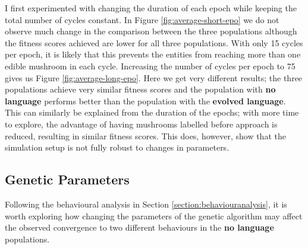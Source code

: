 \documentclass[12pt,a4paper]{report}
\begin{document}
I first experimented with changing the duration of each epoch while keeping the total number of cycles constant. In Figure \ref{fig:average-short-epo} we do not observe much change in the comparison between the three populations although the fitness scores achieved are lower for all three populations. With only 15 cycles per epoch, it is likely that this prevents the entities from reaching more than one edible mushroom in each cycle. Increasing the number of cycles per epoch to 75 gives us Figure \ref{fig:average-long-epo}. Here we get very different results; the three populations achieve very similar fitness scores and the population with {\bf no language} performs better than the population with the {\bf evolved language}. This can similarly be explained from the duration of the epochs; with more time to explore, the advantage of having mushrooms labelled before approach is reduced, resulting in similar fitness scores. This does, however, show that the simulation setup is not fully robust to changes in parameters.
 
 \subsection{Genetic Parameters}
 
Following the behavioural analysis in Section \ref{section:behaviouranalysis}, it is worth exploring how changing the parameters of the genetic algorithm may affect the observed convergence to two different behaviours in the {\bf no language} populations.
\end{document}
